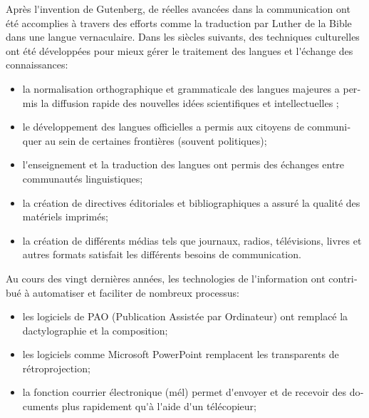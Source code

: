 \begin{french}
\begin{multicols}{2}

Après l{\mbox '}invention de Gutenberg, de réelles avancées dans la
communication ont été accomplies à travers des efforts comme la
traduction par Luther de la Bible dans une langue vernaculaire. Dans
les siècles suivants, des techniques culturelles ont été développées
pour mieux gérer le traitement des langues et l{\mbox '}échange des
connaissances:

\begin{itemize}

\item la normalisation orthographique et grammaticale des langues
  majeures a permis la diffusion rapide des nouvelles idées
  scientifiques et intellectuelles ;

\item le développement des langues officielles a permis aux citoyens
  de communiquer au sein de certaines frontières (souvent politiques);

\item l{\mbox '}enseignement et la traduction des langues ont permis des
  échanges entre communautés linguistiques;

\item la création de directives éditoriales et bibliographiques a
  assuré la qualité des matériels imprimés;

\item la création de différents médias tels que journaux, radios,
  télévisions, livres et autres formats satisfait les différents
  besoins de communication.

\end{itemize}

Au cours des vingt dernières années, les technologies de
l{\mbox '}information ont contribué à automatiser et faciliter de
nombreux processus:

\begin{itemize}

\item les logiciels de PAO (Publication Assistée par Ordinateur) ont
  remplacé la dactylographie et la composition;

\item les logiciels comme Microsoft PowerPoint remplacent les
  transparents de rétroprojection;

\item la fonction courrier électronique (mél) permet d{\mbox '}envoyer
  et de recevoir des documents plus rapidement qu{\mbox '}à l{\mbox
   '}aide d{\mbox '}un télécopieur;


\end{itemize}
\end{multicols}
\end{french}
